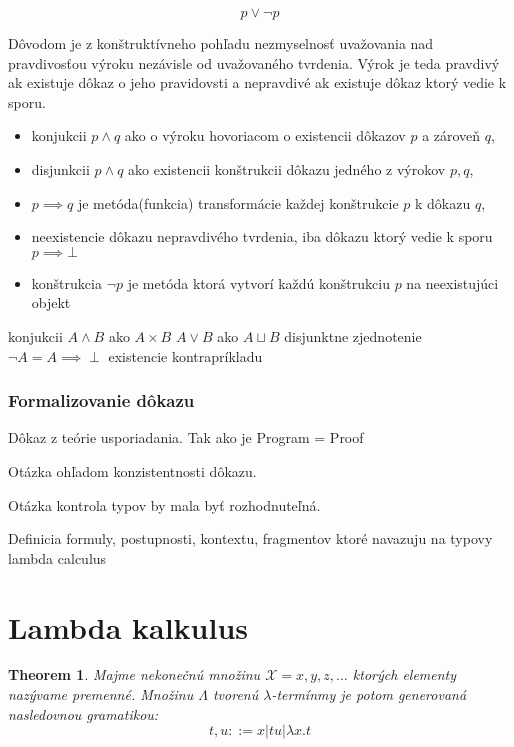 \documentclass[a4paper,10pt,oneside]{report}%
\newtheorem{theorem}{Theorem}
\begin{document}
\begin{equation}
    p \vee \neg p
\end{equation}

Dôvodom je z konštruktívneho pohľadu nezmyselnosť uvažovania nad pravdivosťou
    výroku nezávisle od uvažovaného tvrdenia.
Výrok je teda pravdivý ak existuje dôkaz o jeho pravidovsti a nepravdivé
    ak existuje dôkaz ktorý vedie k sporu.

\begin{itemize}
    \item konjukcii $ p \wedge q $ ako o výroku hovoriacom o existencii dôkazov $p$ a zároveň $q$,
    \item disjunkcii $ p \wedge q $ ako existencii konštrukcii dôkazu jedného z výrokov $p, q$,
    \item $ p \implies q $ je metóda(funkcia) transformácie každej konštrukcie $p$ k dôkazu $q$,
    \item neexistencie dôkazu nepravdivého tvrdenia, iba dôkazu ktorý vedie k sporu $p \implies \bot$
    \item konštrukcia $\neg p$ je metóda ktorá vytvorí každú konštrukciu $p$ na neexistujúci objekt
\end{itemize}

konjukcii $ A \wedge B $ ako $ A \times B $
$ A \vee B $ ako $ A \sqcup B $ disjunktne zjednotenie
$ \neg A = A \implies \perp $ existencie kontrapríkladu

\subsubsection{Formalizovanie dôkazu}

Dôkaz z teórie usporiadania. Tak ako je Program = Proof

Otázka ohľadom konzistentnosti dôkazu.

Otázka kontrola typov by mala byť rozhodnuteľná.

Definicia formuly, postupnosti, kontextu, fragmentov ktoré navazuju na typovy lambda calculus

\section{Lambda kalkulus}

\begin{theorem}
    Majme nekonečnú množinu $ \mathcal{X}={x,y,z,\dots}$ ktorých elementy nazývame premenné.
Množinu $\Lambda$ tvorenú $\lambda$-termínmy je potom generovaná nasledovnou gramatikou:
    \begin{equation}
        t, u ::= x | t u | \lambda x.t
    \end{equation}
\end{theorem}
\end{document}
